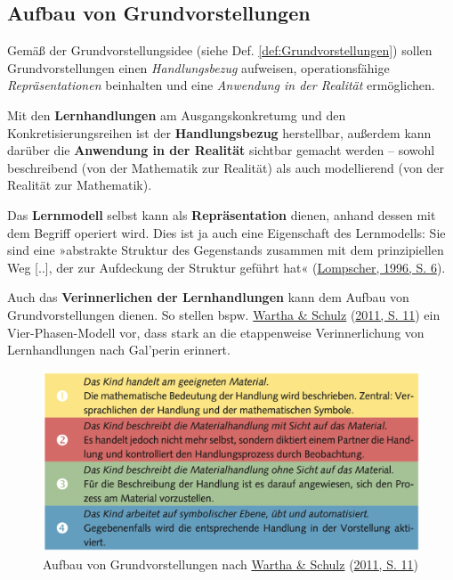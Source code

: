 \documentclass[
  ngerman,
]{scrbook}
\theoremstyle{definition}
\theoremstyle{definition}
\theoremstyle{definition}
\theoremstyle{definition}
\theoremstyle{remark}
\begin{document}
\hypertarget{aufbau-von-grundvorstellungen}{%
\subsection{Aufbau von Grundvorstellungen}\label{aufbau-von-grundvorstellungen}}

Gemäß der Grundvorstellungsidee (siehe Def. \ref{def:Grundvorstellungen}) sollen Grundvorstellungen einen \emph{Handlungsbezug} aufweisen, operationsfähige \emph{Repräsentationen} beinhalten und eine \emph{Anwendung in der Realität} ermöglichen.

Mit den \textbf{Lernhandlungen} am Ausgangskonkretumg und den Konkretisierungsreihen ist der \textbf{Handlungsbezug} herstellbar, außerdem kann darüber die \textbf{Anwendung in der Realität} sichtbar gemacht werden -- sowohl beschreibend (von der Mathematik zur Realität) als auch modellierend (von der Realität zur Mathematik).

Das \textbf{Lernmodell} selbst kann als \textbf{Repräsentation} dienen, anhand dessen mit dem Begriff operiert wird. Dies ist ja auch eine Eigenschaft des Lernmodells: Sie sind eine »abstrakte Struktur des Gegenstands zusammen mit dem prinzipiellen Weg {[}..{]}, der zur Aufdeckung der Struktur geführt hat« (\protect\hyperlink{ref-Lompscher1996}{Lompscher, 1996, S. 6}).

Auch das \textbf{Verinnerlichen der Lernhandlungen} kann dem Aufbau von Grundvorstellungen dienen. So stellen bspw. \protect\hyperlink{ref-Wartha2011}{Wartha \& Schulz} (\protect\hyperlink{ref-Wartha2011}{2011, S. 11}) ein Vier-Phasen-Modell vor, dass stark an die etappenweise Verinnerlichung von Lernhandlungen nach Gal'perin erinnert.



\begin{figure}

{\centering \includegraphics[width=0.9\linewidth]{pictures/7-GVverinnerlichen} 

}

\caption{Aufbau von Grundvorstellungen nach \protect\hyperlink{ref-Wartha2011}{Wartha \& Schulz} (\protect\hyperlink{ref-Wartha2011}{2011, S. 11})}\label{fig:GVVerinnerlichen}
\end{figure}
\end{document}
